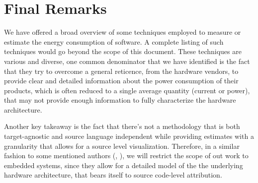 \section{Final Remarks}
We have offered a broad overview of some techniques employed to measure or estimate the energy consumption of software. A complete listing of such techniques would go beyond the scope of this document. These techniques are various and diverse, one common denominator that we have identified is the fact that they try to overcome a general reticence, from the hardware vendors, to provide clear and detailed information about the power consumption of their products, which is often reduced to a single average quantity (current or power), that may not provide enough information to fully characterize the hardware architecture.
\par
Another key takeaway is the fact that there's not a methodology that is both target-agnostic and source language independent while providing estimates with a granularity that allows for a source level visualization. Therefore, in a similar fashion to some mentioned authors (\cite{eder}, \cite{brando2011}), we will restrict the scope of out work to embedded systems, since they allow for a detailed model of the the underlying hardware architecture, that bears itself to source code-level attribution.
